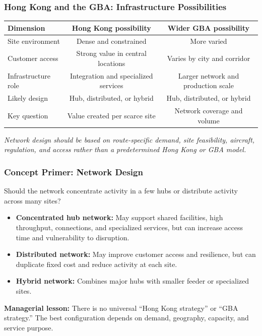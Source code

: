 \documentclass{beamer}
\begin{document}
\begin{frame}[t]
\frametitle{Hong Kong and the GBA: Infrastructure Possibilities}
\begin{center}\small
\begin{tabular}{l|cc}
\textbf{Dimension} & \textbf{Hong Kong possibility} & \textbf{Wider GBA possibility}\\
\hline
Site environment & Dense and constrained & More varied\\
Customer access & Strong value in central locations & Varies by city and corridor\\
Infrastructure role & Integration and specialized services & Larger network and production scale\\
Likely design & Hub, distributed, or hybrid & Hub, distributed, or hybrid\\
Key question & Value created per scarce site & Network coverage and volume\\
\end{tabular}
\end{center}
\vspace{0.3cm}
\textit{Network design should be based on route-specific demand, site feasibility, aircraft, regulation, and access rather than a predetermined Hong Kong or GBA model.}
\end{frame}
\begin{frame}[t]
\frametitle{Concept Primer: Network Design}
Should the network concentrate activity in a few hubs or distribute activity across many sites?
\begin{itemize}
\item \textbf{Concentrated hub network:} May support shared facilities, high throughput, connections, and specialized services, but can increase access time and vulnerability to disruption.
\item \textbf{Distributed network:} May improve customer access and resilience, but can duplicate fixed cost and reduce activity at each site.
\item \textbf{Hybrid network:} Combines major hubs with smaller feeder or specialized sites.
\end{itemize}
\textbf{Managerial lesson:} There is no universal ``Hong Kong strategy'' or ``GBA strategy.'' The best configuration depends on demand, geography, capacity, and service purpose.
\end{frame}
\end{document}

